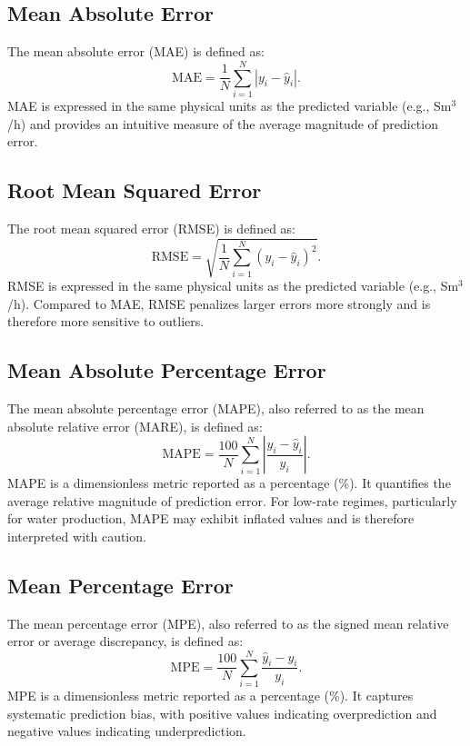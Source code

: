 \documentclass[12pt,APA]{uomthesis}
\begin{document}
\subsection{Mean Absolute Error}
The mean absolute error (MAE) is defined as:
\begin{equation}
\text{MAE} = \frac{1}{N} \sum_{i=1}^{N} \left| y_i - \hat{y}_i \right|.
\end{equation}
MAE is expressed in the same physical units as the predicted variable (e.g., Sm$^3$/h) and provides an intuitive measure of the average magnitude of prediction error.

\subsection{Root Mean Squared Error}
The root mean squared error (RMSE) is defined as:
\begin{equation}
\text{RMSE} =
\sqrt{\frac{1}{N} \sum_{i=1}^{N} (y_i - \hat{y}_i)^2 }.
\end{equation}
RMSE is expressed in the same physical units as the predicted variable (e.g., Sm$^3$/h). Compared to MAE, RMSE penalizes larger errors more strongly and is therefore more sensitive to outliers.

\subsection{Mean Absolute Percentage Error}
The mean absolute percentage error (MAPE), also referred to as the mean absolute relative error (MARE), is defined as:
\begin{equation}
\text{MAPE} = \frac{100}{N}
\sum_{i=1}^{N}
\left| \frac{y_i - \hat{y}_i}{y_i} \right|.
\end{equation}
MAPE is a dimensionless metric reported as a percentage (\%). It quantifies the average relative magnitude of prediction error. For low-rate regimes, particularly for water production, MAPE may exhibit inflated values and is therefore interpreted with caution.

\subsection{Mean Percentage Error}
The mean percentage error (MPE), also referred to as the signed mean relative error or average discrepancy, is defined as:
\begin{equation}
\text{MPE} = \frac{100}{N}
\sum_{i=1}^{N}
\frac{\hat{y}_i - y_i}{y_i}.
\end{equation}
MPE is a dimensionless metric reported as a percentage (\%). It captures systematic prediction bias, with positive values indicating overprediction and negative values indicating underprediction.
\end{document}
